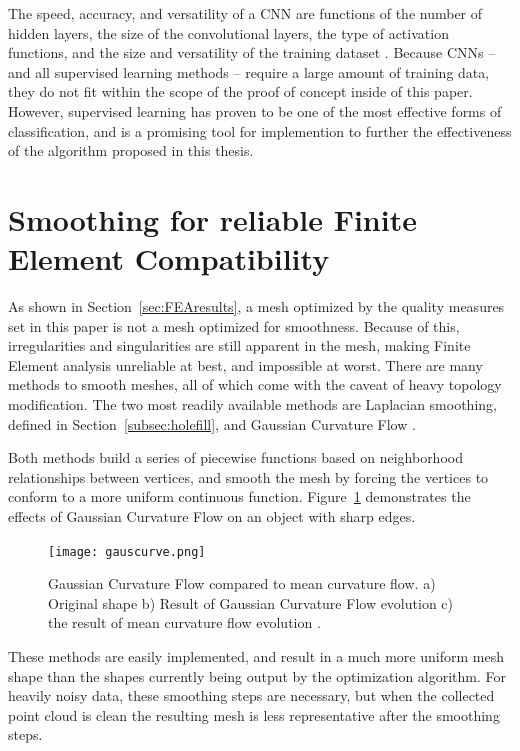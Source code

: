 \documentclass[12pt]{drexelthesis}
\let\Oldsection\section
\renewcommand{\section}{\FloatBarrier\Oldsection}
\begin{document}
The speed, accuracy, and versatility of a CNN are functions of the number of hidden layers, the size of the convolutional layers, the type of activation functions, and the size and versatility of the training dataset \cite{RN7}. Because CNNs -- and all supervised learning methods -- require a large amount of training data, they do not fit within the scope of the proof of concept inside of this paper. However, supervised learning has proven to be one of the most effective forms of classification, and is a promising tool for implemention to further the effectiveness of the algorithm proposed in this thesis.

\section{Smoothing for reliable Finite Element Compatibility}
As shown in Section~\ref{sec:FEAresults}, a mesh optimized by the quality measures set in this paper is not a mesh optimized for smoothness. Because of this, irregularities and singularities are still apparent in the mesh, making Finite Element analysis unreliable at best, and impossible at worst. There are many methods to smooth meshes, all of which come with the caveat of heavy topology modification. The two most readily available methods are Laplacian smoothing, defined in Section~\ref{subsec:holefill}, and Gaussian Curvature Flow \cite{RN44}.

Both methods build a series of piecewise functions based on neighborhood relationships between vertices, and smooth the mesh by forcing the vertices to conform to a more uniform continuous function. Figure~\ref{gausscurve} demonstrates the effects of Gaussian Curvature Flow on an object with sharp edges.

\begin{figure}
	\centering
	\texttt{[image: gauscurve.png]}
	\caption[Gaussian Curvature Flow example]{\centering Gaussian Curvature Flow compared to mean curvature flow. a) Original shape b) Result of Gaussian Curvature Flow evolution c) the result of mean curvature flow evolution \cite{RN44}.}
	\label{gausscurve}
\end{figure}

These methods are easily implemented, and result in a much more uniform mesh shape than the shapes currently being output by the optimization algorithm. For heavily noisy data, these smoothing steps are necessary, but when the collected point cloud is clean the resulting mesh is less representative after the smoothing steps.
\end{document}
